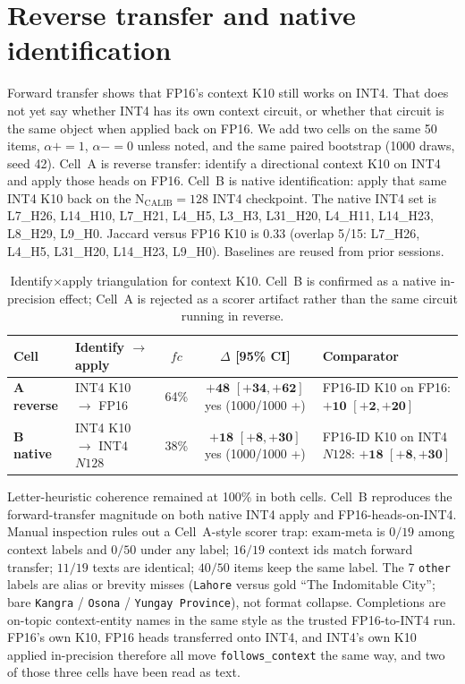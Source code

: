 \documentclass{article} %
\begin{document}
\clearpage
\appendix

\section{Reverse transfer and native identification}
\label{app:reverse}

Forward transfer shows that FP16's context K10 still works on INT4. That does not yet say whether INT4 has its own context circuit, or whether that circuit is the same object when applied back on FP16. We add two cells on the same 50 items, $\alpha{+}{=}1$, $\alpha{-}{=}0$ unless noted, and the same paired bootstrap (1000 draws, seed 42). Cell~A is reverse transfer: identify a directional context K10 on INT4 and apply those heads on FP16. Cell~B is native identification: apply that same INT4 K10 back on the $\mathrm{N_{CALIB}{=}128}$ INT4 checkpoint. The native INT4 set is L7\_H26, L14\_H10, L7\_H21, L4\_H5, L3\_H3, L31\_H20, L4\_H11, L14\_H23, L8\_H29, L9\_H0. Jaccard versus FP16 K10 is $0.33$ (overlap 5/15: L7\_H26, L4\_H5, L31\_H20, L14\_H23, L9\_H0). Baselines are reused from prior sessions.

\begin{table}[h]
\caption{Identify$\times$apply triangulation for context K10. Cell~B is confirmed as a native in-precision effect; Cell~A is rejected as a scorer artifact rather than the same circuit running in reverse.}
\label{tab:cells}
\centering
\footnotesize
\setlength{\tabcolsep}{2pt}
\begin{tabular}{lp{1.15in}ccp{1.7in}}
\toprule
Cell & Identify $\to$ apply & $fc$ & $\Delta$ [95\% CI] & Comparator \\
\midrule
\textbf{A reverse} & INT4 K10 $\to$ FP16 & 64\% & $\mathbf{+48}$ $\mathbf{[+34, +62]}$ yes (1000/1000 +) & FP16-ID K10 on FP16: $\mathbf{+10}$ $\mathbf{[+2, +20]}$ \\
\textbf{B native} & INT4 K10 $\to$ INT4 $N128$ & 38\% & $\mathbf{+18}$ $\mathbf{[+8, +30]}$ yes (1000/1000 +) & FP16-ID K10 on INT4 $N128$: $\mathbf{+18}$ $\mathbf{[+8, +30]}$ \\
\bottomrule
\end{tabular}
\end{table}

Letter-heuristic coherence remained at 100\% in both cells. Cell~B reproduces the forward-transfer magnitude on both native INT4 apply and FP16-heads-on-INT4. Manual inspection rules out a Cell~A-style scorer trap: exam-meta is $0/19$ among context labels and $0/50$ under any label; $16/19$ context ids match forward transfer; $11/19$ texts are identical; $40/50$ items keep the same label. The 7 \texttt{other} labels are alias or brevity misses (\texttt{Lahore} versus gold ``The Indomitable City''; bare \texttt{Kangra} / \texttt{Osona} / \texttt{Yungay Province}), not format collapse. Completions are on-topic context-entity names in the same style as the trusted FP16-to-INT4 run. FP16's own K10, FP16 heads transferred onto INT4, and INT4's own K10 applied in-precision therefore all move \texttt{follows\_context} the same way, and two of those three cells have been read as text.
\end{document}
